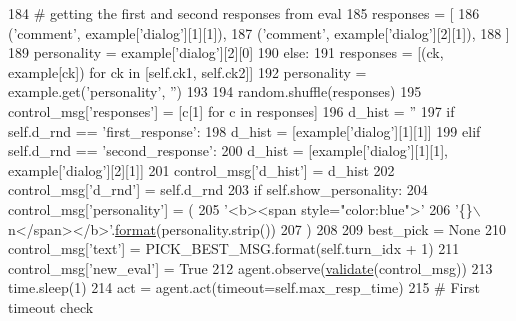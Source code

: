 \begin{DoxyCode}
184                 \textcolor{comment}{# getting the first and second responses from eval}
185                 responses = [
186                     (\textcolor{stringliteral}{'comment'}, example[\textcolor{stringliteral}{'dialog'}][1][1]),
187                     (\textcolor{stringliteral}{'comment'}, example[\textcolor{stringliteral}{'dialog'}][2][1]),
188                 ]
189                 personality = example[\textcolor{stringliteral}{'dialog'}][2][0]
190             \textcolor{keywordflow}{else}:
191                 responses = [(ck, example[ck]) \textcolor{keywordflow}{for} ck \textcolor{keywordflow}{in} [self.ck1, self.ck2]]
192                 personality = example.get(\textcolor{stringliteral}{'personality'}, \textcolor{stringliteral}{''})
193 
194             random.shuffle(responses)
195             control\_msg[\textcolor{stringliteral}{'responses'}] = [c[1] \textcolor{keywordflow}{for} c \textcolor{keywordflow}{in} responses]
196             d\_hist = \textcolor{stringliteral}{''}
197             \textcolor{keywordflow}{if} self.d\_rnd == \textcolor{stringliteral}{'first\_response'}:
198                 d\_hist = [example[\textcolor{stringliteral}{'dialog'}][1][1]]
199             \textcolor{keywordflow}{elif} self.d\_rnd == \textcolor{stringliteral}{'second\_response'}:
200                 d\_hist = [example[\textcolor{stringliteral}{'dialog'}][1][1], example[\textcolor{stringliteral}{'dialog'}][2][1]]
201             control\_msg[\textcolor{stringliteral}{'d\_hist'}] = d\_hist
202             control\_msg[\textcolor{stringliteral}{'d\_rnd'}] = self.d\_rnd
203             \textcolor{keywordflow}{if} self.show\_personality:
204                 control\_msg[\textcolor{stringliteral}{'personality'}] = (
205                     \textcolor{stringliteral}{'<b><span style="color:blue">'}
206                     \textcolor{stringliteral}{'\{\}\(\backslash\)n</span></b>'}.\hyperlink{namespaceparlai_1_1chat__service_1_1services_1_1messenger_1_1shared__utils_a32e2e2022b824fbaf80c747160b52a76}{format}(personality.strip())
207                 )
208 
209             best\_pick = \textcolor{keywordtype}{None}
210             control\_msg[\textcolor{stringliteral}{'text'}] = PICK\_BEST\_MSG.format(self.turn\_idx + 1)
211             control\_msg[\textcolor{stringliteral}{'new\_eval'}] = \textcolor{keyword}{True}
212             agent.observe(\hyperlink{namespaceparlai_1_1core_1_1worlds_afc3fad603b7bce41dbdc9cdc04a9c794}{validate}(control\_msg))
213             time.sleep(1)
214             act = agent.act(timeout=self.max\_resp\_time)
215             \textcolor{comment}{# First timeout check}

\end{DoxyCode}
